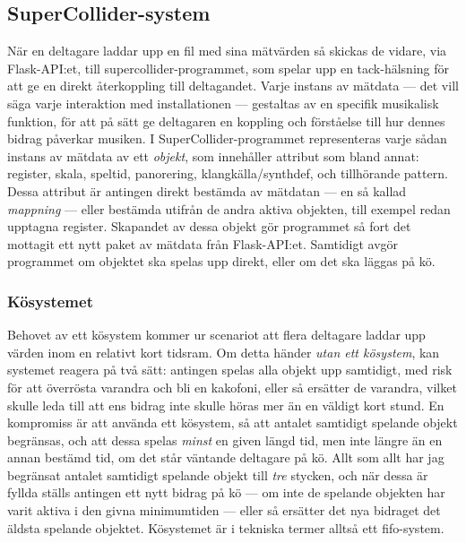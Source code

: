 \documentclass[11pt, a4paper]{article} %
\begin{document}
\subsection*{SuperCollider-system}
När en deltagare laddar upp en fil med sina mätvärden så skickas de vidare, via Flask-API:et, till \gls{supercollider}-programmet, som spelar upp en tack-hälsning för att ge en direkt återkoppling till deltagandet. Varje instans av mätdata --- det vill säga varje interaktion med installationen --- gestaltas av en specifik musikalisk funktion, för att på sätt ge deltagaren en koppling och förståelse till hur dennes bidrag påverkar musiken. 
I SuperCollider-programmet representeras varje sådan instans av mätdata av ett \emph{objekt}, som innehåller attribut som bland annat: register, skala, speltid, panorering, klangkälla/\gls{synthdef}, och tillhörande {\gls{pattern}}. Dessa attribut är antingen direkt bestämda av mätdatan --- en så kallad \emph{mappning} --- eller bestämda utifrån de andra aktiva objekten, till exempel redan upptagna register. Skapandet av dessa objekt gör programmet så fort det mottagit ett nytt paket av mätdata från Flask-API:et. Samtidigt avgör programmet om objektet ska spelas upp direkt, eller om det ska läggas på kö. 

\subsubsection*{Kösystemet}
Behovet av ett kösystem kommer ur scenariot att flera deltagare laddar upp värden inom en relativt kort tidsram. Om detta händer \emph{utan ett kösystem}, kan systemet reagera på två sätt: antingen spelas alla objekt upp samtidigt, med risk för att överrösta varandra och bli en kakofoni, eller så ersätter de varandra, vilket skulle leda till att ens bidrag inte skulle höras mer än en väldigt kort stund. En kompromiss är att använda ett kösystem, så att antalet samtidigt spelande objekt begränsas, och att dessa spelas \emph{minst} en given längd tid, men inte längre än en annan bestämd tid, om det står väntande deltagare på kö. Allt som allt har jag begränsat antalet samtidigt spelande objekt till \emph{tre} stycken, och när dessa är fyllda ställs antingen ett nytt bidrag på kö --- om inte de spelande objekten har varit aktiva i den givna minimumtiden --- eller så ersätter det nya bidraget det äldsta spelande objektet. Kösystemet är i tekniska termer alltså ett \gls{fifo}-system.
\end{document}

